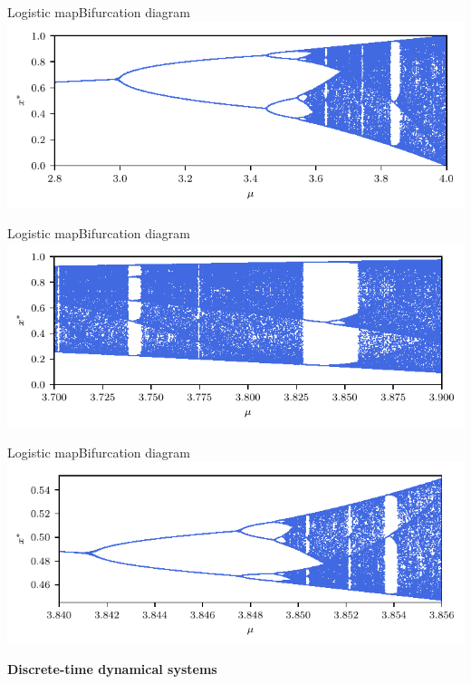\documentclass[usenames,dvipsnames,svgnames,10pt,aspectratio=169]{beamer}
\begin{document}
\begin{frame}[t, c]{Logistic map}{Bifurcation diagram}
	\centering
	\includegraphics[width=.75\textwidth]{logistic_map_bifurcation_zoom_1}

	\vspace{1cm}
\end{frame}

\begin{frame}[t, c]{Logistic map}{Bifurcation diagram}
	\centering
	\includegraphics[width=.75\textwidth]{logistic_map_bifurcation_zoom_2}

	\vspace{1cm}
\end{frame}

\begin{frame}[t, c]{Logistic map}{Bifurcation diagram}
	\centering
	\includegraphics[width=.75\textwidth]{logistic_map_bifurcation_zoom_3}

	\vspace{1cm}
\end{frame}

\begin{frame}[t, c]{}
	\centering
	\vspace{1cm}

	{\Large \textbf{Discrete-time dynamical systems}}

	\bigskip

	{}

\end{frame}
\end{document}
